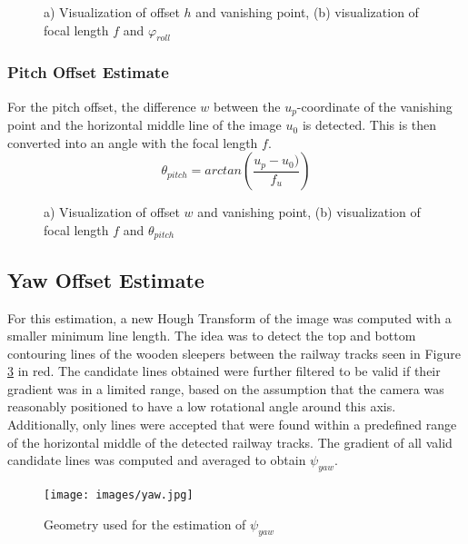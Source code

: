 \begin{figure}[h]
    \centering
    \caption{a) Visualization of offset $h$ and vanishing point, (b) visualization of focal length $f$ and $\varphi_{roll}$}
    \label{pics:x_angle2}
\end{figure}







\subsubsection{Pitch Offset Estimate}
For the pitch offset, the difference $w$ between the $u_p$-coordinate of the vanishing point and the horizontal middle line of the image $u_0$ is detected. This is then converted into an angle with the focal length $f$. 
\begin{equation}
\theta_{pitch} = arctan(\frac{u_p - u_0)}{f_u}) 
\label{eq:y_angle}
\end{equation}

\begin{figure}[h]
    \centering
    \caption{a) Visualization of offset $w$ and vanishing point, (b) visualization of focal length $f$ and $\theta_{pitch}$}
    \label{pics:y_angle2}
\end{figure}


\newpage
\subsection{Yaw Offset Estimate}
For this estimation, a new Hough Transform of the image was computed with a smaller minimum line length. The idea was to detect the top and bottom contouring lines of the wooden sleepers between the railway tracks seen in Figure \ref{pics:z_angle} in red. The candidate lines obtained were further filtered to be valid if their gradient was in a limited range, based on the assumption that the camera was reasonably positioned to have a low rotational angle around this axis. Additionally, only lines were accepted that were found within a predefined range of the horizontal middle of the detected railway tracks. The gradient of all valid candidate lines was computed and averaged to obtain $\psi_{yaw}$.

\begin{figure}[h!]
   \centering
   \texttt{[image: images/yaw.jpg]}
   \caption{Geometry used for the estimation of $\psi_{yaw}$}
   \label{pics:z_angle}
\end{figure}






